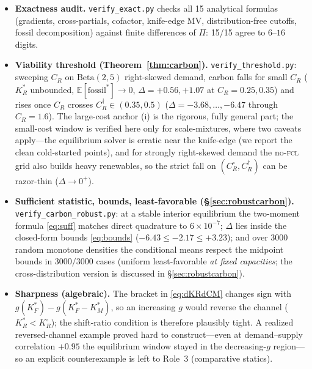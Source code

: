 \documentclass[11pt,reqno]{amsart}
\theoremstyle{plain}
\theoremstyle{definition}
\theoremstyle{remark}
\newcommand{\KRs}{K_R^{*}}
\newcommand{\KFs}{K_F^{*}}
\newcommand{\KMs}{K_M^{*}}
\newcommand{\KRo}{K_R^{\circ}}
\newcommand{\CM}{C_M}
\newcommand{\CR}{C_R}
\newcommand{\E}{\mathbb{E}}
\begin{document}
\begin{itemize}[leftmargin=1.6em]
        finite-difference at the knife-edge $\KRs=9.2$), confirming the channel
        across the crossing. The Hessian's three eigenvalues are all strictly negative on the
        interior path and acquire a zero only as $\KRs\!\to\!\infty$ at the
        knife-edge ($\CM=0.30$, $\KRs=9.2$ and climbing)---the boundary where
        Condition~\ref{cond:reg} lapses and the inequality is anyway immediate.
  \item \textbf{Exactness audit.} \texttt{verify\_exact.py} checks all 15
        analytical formulas (gradients, cross-partials, cofactor, knife-edge
        $\mathrm{MV}$, distribution-free cutoffs, fossil decomposition) against
        finite differences of $\Pi$: 15/15 agree to $6$--$16$ digits.
  \item \textbf{Viability threshold (Theorem~\ref{thm:carbon}).}
        \texttt{verify\_threshold.py}: sweeping $\CR$ on $\mathrm{Beta}(2,5)$
        right-skewed demand, carbon falls for small $\CR$ ($\KRs$ unbounded,
        $\E[\text{fossil}^{*}]\!\to\!0$, $\Delta=+0.56,+1.07$ at $\CR=0.25,0.35$)
        and rises once $\CR$ crosses $\CR^{\dagger}\!\in\!(0.35,0.5)$
        ($\Delta=-3.68,\dots,-6.47$ through $\CR=1.6$). The large-cost anchor (i)
        is the rigorous, fully general part; the small-cost window is verified
        here only for scale-mixtures, where two caveats apply---the equilibrium
        solver is erratic near the knife-edge (we report the clean
        cold-started points), and for strongly right-skewed demand the no-\textsc{fcl}
        grid also builds heavy renewables, so the strict fall on
        $(\CR^{\circ},\CR^{\dagger})$ can be razor-thin ($\Delta\!\to\!0^{+}$).
  \item \textbf{Sufficient statistic, bounds, least-favorable
        (\S\ref{sec:robustcarbon}).} \texttt{verify\_carbon\_robust.py}: at a
        stable interior equilibrium the two-moment formula \eqref{eq:suff} matches
        direct quadrature to $6\times10^{-7}$; $\Delta$ lies inside the
        closed-form bounds \eqref{eq:bounds} ($-6.43\le-2.17\le+3.23$); and over
        $3000$ random monotone densities the conditional means respect the
        midpoint bounds in $3000/3000$ cases (uniform least-favorable \emph{at fixed
        capacities}; the cross-distribution version is discussed in
        \S\ref{sec:robustcarbon}).
  \item \textbf{Sharpness (algebraic).} The bracket in \eqref{eq:dKRdCM} changes
        sign with $g(\KFs)-g(\KFs-\KMs)$, so an increasing $g$ would reverse the
        channel ($\KRs<\KRo$); the shift-ratio condition is therefore plausibly
        tight. A realized reversed-channel example proved hard to construct---even
        at demand--supply correlation $+0.95$ the equilibrium window stayed in the
        decreasing-$g$ region---so an explicit counterexample is left to Role~3
        (comparative statics).
\end{itemize}
\end{document}
